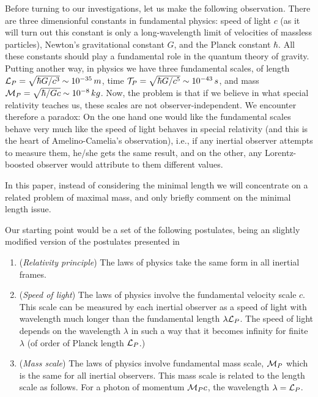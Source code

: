 \documentclass [11pt] {article}
\begin{document}
Before turning to our investigations, let us make the following
observation. There are three dimensionful constants in fundamental
physics: speed of light $c$ (as it will turn out this constant is
only a long-wavelength limit of velocities of massless particles),
Newton's gravitational constant $G$, and the Planck constant
$\hbar$. All these constants should play a fundamental role in the
quantum theory of gravity. Putting another way, in
 physics we have three fundamental scales, of length
 ${\cal L}_P = \sqrt{\hbar G/c^3} \sim 10^{-35}\, m$,
 time ${\cal T}_P = \sqrt{\hbar G/c^5} \sim 10^{-43}\, s$, and mass
 ${\cal M}_P = \sqrt{\hbar /G c} \sim 10^{-8}\, kg$.  Now, the problem
 is that if we believe in what special relativity teaches us,
 these scales are not observer-independent. We encounter therefore a paradox:
 On the one
 hand one would like the fundamental scales
  behave very much like the speed of light behaves in
 special relativity (and this is the heart of Amelino-Camelia's observation),
  i.e., if any inertial observer attempts to
 measure them, he/she gets the same result, and on the other, any
 Lorentz-boosted observer
 would attribute to them different values. 



In this paper, instead of considering the minimal length we will 
concentrate on a related problem of 
 maximal mass, 
and only briefly comment on the minimal length issue. 



 

 Our starting point would be  a set of the following postulates, being
 an slightly modified version of the postulates presented in \cite{gac1}



 \begin{enumerate}



 \item ({\em Relativity principle}) The laws
 of physics take the same form in all inertial frames.
\item ({\em Speed of light}) The laws of physics
involve the fundamental velocity scale $c$. This scale can be measured by
each inertial observer as a speed of light with wavelength much longer than 
the fundamental length $\lambda {\cal L}_P$. The speed of light depends on 
the wavelength $\lambda$ in such a way that it becomes infinity for finite 
$\lambda$ (of order of Planck length ${\cal L}_P$.) 
\item ({\em Mass scale}) The laws of physics
involve fundamental mass  scale, ${\cal M}_P$  which is the same
for all inertial observers. This mass scale is related to the
length scale as follows. For a photon of momentum ${\cal M}_P c$,
the wavelength $\lambda ={\cal L}_P$.
 \end{enumerate}
\end{document}
